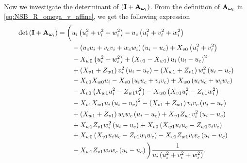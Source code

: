 Now we investigate the determinant of $(\mathbf{I} + \mathbf{A}_{\bm{\omega}_i})$.
From the definition of $\mathbf{A}_{\bm{\omega}_i}$ in \eqref{eq:NSB_R_omega_v_affine}, we get the following expression
\begin{align}
    \det\left(\mathbf{I} + \mathbf{A}_{\bm{\omega}_i}\right) = \bigg( &
    u_i\left(u_i^2 + v_i^2 + w_i^2\right) - u_c\left(u_i^2 + v_i^2 + w_i^2\right) \nonumber \\
    & - \left(u_cu_i + v_cv_i + w_cw_i\right)\left(u_i - u_c\right) + X_{v0}\left(u_i^2 + v_i^2\right) \nonumber \\
    & - X_{w0}\left(u_i^2 + w_i^2\right) + \left(X_{v1} - X_{w1}\right)u_i\left(u_i - u_c\right)^2 \nonumber \\
    & + \left(X_{v1} + Z_{w1}\right)v_i^2\left(u_i - u_c\right) - \left(X_{w1} + Z_{v1}\right)w_i^2\left(u_i - u_c\right) \nonumber \\
    & - X_{v0}X_{w0}u_i - X_{v0}\left(u_iu_c + v_iv_c\right) + X_{w0}\left(u_iu_c + w_iw_c\right) \nonumber \\
    & - X_{v0}\left(X_{w1}u_i^2 - Z_{w1}v_i^2\right) - X_{w0}\left(X_{v1}u_i^2 - Z_{v1}w_i^2\right) \nonumber \\
    & - X_{v1}X_{w1}u_i\left(u_i - u_c\right)^2 - \left(X_{v1} + Z_{w1}\right)v_iv_c\left(u_i - u_c\right) \nonumber \\
    & + \left(X_{w1} + Z_{v1}\right)w_iw_c\left(u_i - u_c\right) + X_{v1}Z_{w1}v_i^2\left(u_i - u_c\right) \nonumber \\
    & + X_{w1}Z_{v1}w_i^2\left(u_i - u_c\right) + X_{v0}\left(X_{w1}u_iu_c - Z_{w1}v_iv_c\right) \nonumber \\
    & + X_{w0}\left(X_{v1}u_iu_c - Z_{v1}w_iw_c\right) - X_{v1}Z_{w1}v_iv_c\left(u_i - u_c\right) \nonumber \\
    & - X_{w1}Z_{v1}w_iw_c\left(u_i - u_c\right)\bigg) \frac{1}{u_i\left(u_i^2 + v_i^2 + w_i^2\right)}.
\end{align}
